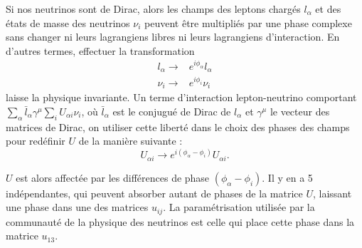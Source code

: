             Si nos neutrinos sont de Dirac, alors les champs des leptons chargés $l_{\alpha}$ et des états de masse des neutrinos $\nu_i$ peuvent être multipliés par une phase complexe sans changer ni leurs lagrangiens libres ni leurs lagrangiens d'interaction. En d'autres termes, effectuer la transformation 
            \begin{eqnarray}
                l_{\alpha}\to & e^{i\phi_{\alpha}}l_{\alpha} \\
                \nu_i\to & e^{i\phi_i}\nu_i 
            \end{eqnarray}
            laisse la physique invariante. Un terme d'interaction lepton-neutrino comportant $\sum_{\alpha}\bar{l}_{\alpha}\gamma^{\mu}\sum_i U_{\alpha i}\nu_i$, où $\bar{l}_{\alpha}$ est le conjugué de Dirac de $l_{\alpha}$ et $\gamma^{\mu}$ le vecteur des matrices de Dirac, on utiliser cette liberté dans le choix des phases des champs pour redéfinir $U$ de la manière suivante :
            \begin{equation}
                U_{\alpha i}\to e^{i(\phi_{\alpha}-\phi_i)}U_{\alpha i}.
            \end{equation}
            
            $U$ est alors affectée par les différences de phase $(\phi_{\alpha}-\phi_i)$. Il y en a 5 indépendantes, qui peuvent absorber autant de phases de la matrice $U$, laissant une phase dans une des matrices $u_{ij}$. La paramétrisation utilisée par la communauté de la physique des neutrinos est celle qui place cette phase dans la matrice $u_{13}$.
            
